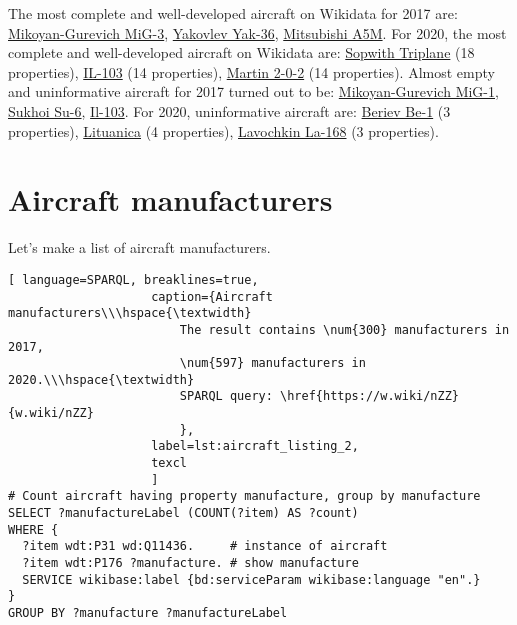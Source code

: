 The most complete and well-developed aircraft on Wikidata for 2017 are: \href{https://www.wikidata.org/wiki/Q271446}{Mikoyan-Gurevich MiG-3}, 
\href{https://www.wikidata.org/wiki/Q1349098}{Yakovlev Yak-36}, \href{https://www.wikidata.org/wiki/Q429839}{Mitsubishi A5M}. 
For 2020, the most complete and well-developed aircraft on Wikidata are: \href{https://www.wikidata.org/wiki/Q770863}{Sopwith Triplane} (18 properties), 
\href{https://www.wikidata.org/wiki/Q1658673}{IL-103} (14 properties), \href{https://www.wikidata.org/wiki/Q665071}{Martin 2-0-2} (14 properties).
Almost empty and uninformative aircraft for 2017 turned out to be: \href{https://www.wikidata.org/wiki/Q464247}{Mikoyan-Gurevich MiG-1}, 
\href{https://www.wikidata.org/wiki/Q2296502}{Sukhoi Su-6}, \href{https://www.wikidata.org/wiki/Q1658673}{Il-103}.
For 2020, uninformative aircraft are: \href{https://www.wikidata.org/wiki/Q820603}{Beriev Be-1} (3 properties), \href{https://www.wikidata.org/wiki/Q117984}{Lituanica} (4 properties), 
\href{https://www.wikidata.org/wiki/Q572762}{Lavochkin La-168} (3 properties).


\section{Aircraft manufacturers}

Let's make a list of aircraft manufacturers.

\begin{lstlisting}[ language=SPARQL, breaklines=true, 
                    caption={Aircraft manufacturers\\\hspace{\textwidth}
                        The result contains \num{300} manufacturers in 2017, 
                        \num{597} manufacturers in 2020.\\\hspace{\textwidth}
                        SPARQL query: \href{https://w.wiki/nZZ}{w.wiki/nZZ}
                        },
                    label=lst:aircraft_listing_2,
                    texcl 
                    ]
# Count aircraft having property manufacture, group by manufacture
SELECT ?manufactureLabel (COUNT(?item) AS ?count) 
WHERE {
  ?item wdt:P31 wd:Q11436.     # instance of aircraft
  ?item wdt:P176 ?manufacture. # show manufacture
  SERVICE wikibase:label {bd:serviceParam wikibase:language "en".}
}
GROUP BY ?manufacture ?manufactureLabel 
\end{lstlisting}


